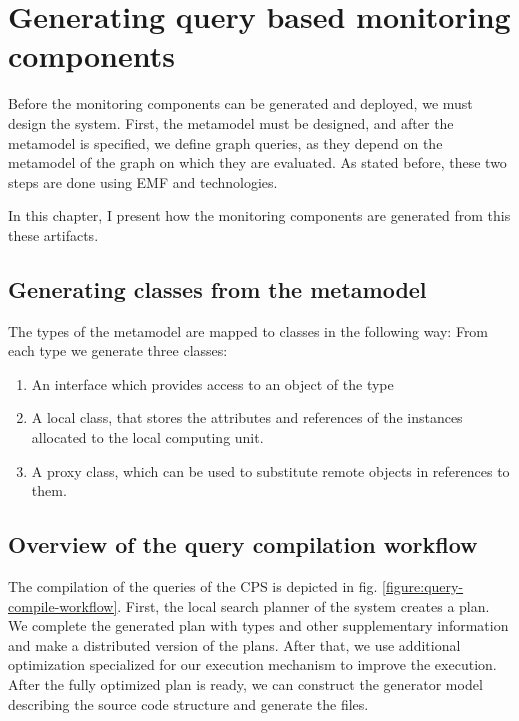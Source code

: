 \chapter{Generating query based monitoring components}

Before the monitoring components can be generated and deployed, we must design the system. First, the metamodel must be designed, and after the metamodel is specified, we define graph queries, as they depend on the metamodel of the graph on which they are evaluated. As stated before, these two steps are done using EMF and \viatra{} technologies.

In this chapter, I present how the monitoring components are generated from this these artifacts. 

\section{Generating classes from the metamodel}

The types of the metamodel are mapped to \cpp{} classes in the following way: From each type we generate three \cpp{} classes:

\begin{enumerate}
	\item An interface which provides access to an object of the type
	\item A local class, that stores the attributes and references of the instances allocated to the local computing unit.
	\item A proxy class, which can be used to substitute remote objects in references to them.
\end{enumerate}


\section{Overview of the query compilation workflow}

The compilation of the queries of the CPS is depicted in fig. \ref{figure:query-compile-workflow}. First, the local search planner of the \viatra{} system creates a plan. We complete the generated plan with types and other supplementary information and make a distributed version of the plans. After that, we use additional optimization specialized for our execution mechanism to improve the execution. After the fully optimized plan is ready, we can construct the generator model describing the source code structure and generate the \cpp{} files.

